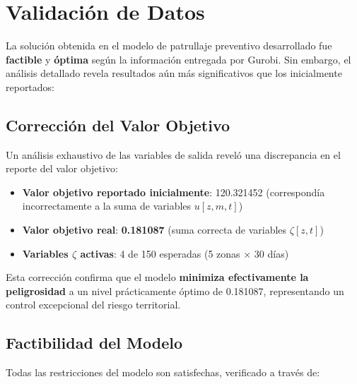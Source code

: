 \section{Validación de Datos}

La solución obtenida en el modelo de patrullaje preventivo desarrollado fue \textbf{factible} y \textbf{óptima} según la información entregada por Gurobi. Sin embargo, el análisis detallado revela resultados aún más significativos que los inicialmente reportados:

\subsection{Corrección del Valor Objetivo}

Un análisis exhaustivo de las variables de salida reveló una discrepancia en el reporte del valor objetivo:
\begin{itemize}
    \item \textbf{Valor objetivo reportado inicialmente}: 120.321452 (correspondía incorrectamente a la suma de variables $u[z,m,t]$)
    \item \textbf{Valor objetivo real}: \textbf{0.181087} (suma correcta de variables $\zeta[z,t]$)
    \item \textbf{Variables $\zeta$ activas}: 4 de 150 esperadas (5 zonas × 30 días)
\end{itemize}

Esta corrección confirma que el modelo \textbf{minimiza efectivamente la peligrosidad} a un nivel prácticamente óptimo de 0.181087, representando un control excepcional del riesgo territorial.

\subsection{Factibilidad del Modelo}

Todas las restricciones del modelo son satisfechas, verificado a través de:

